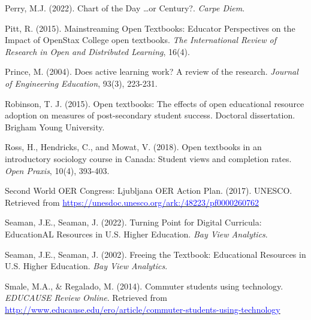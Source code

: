 \documentclass[11pt]{article}
\newcommand{\alink}[2]{\href{#1}{\textcolor{blue}{#2}}}
\begin{document}
\begin{thebibliography}{99}
   Perry, M.J. (2022). Chart of the Day \ldots or Century?. {\em Carpe Diem}.%

   Pitt, R. (2015). Mainstreaming Open Textbooks: Educator Perspectives on the Impact of OpenStax College open textbooks. {\em The International Review of Research in Open and Distributed Learning}, 16(4).

   Prince, M. (2004). Does active learning work? A review of the research. {\em Journal of Engineering Education}, 93(3), 223-231.

   Robinson, T. J. (2015). Open textbooks: The effects of open educational resource adoption on measures of post-secondary student success. Doctoral dissertation. Brigham Young University.

   Ross, H., Hendricks, C., and Mowat, V. (2018). Open textbooks in an introductory sociology course in Canada: Student views and completion rates. {\em Open Praxis}, 10(4), 393-403.

   Second World OER Congress: Ljubljana OER Action Plan. (2017). UNESCO. \newline Retrieved from \alink{https://unesdoc.unesco.org/ark:/48223/pf0000260762}{https://unesdoc.unesco.org/ark:/48223/pf0000260762}

   Seaman, J.E., Seaman, J. (2022). Turning Point for Digital Curricula: EducationAL Resources in U.S. Higher Education. {\em Bay View Analytics}.%

   Seaman, J.E., Seaman, J. (2002). Freeing the Textbook: Educational Resources in U.S. Higher Education. {\em Bay View Analytics}. %

   Smale, M.A., \& Regalado, M. (2014). Commuter students using technology. {\em EDUCAUSE Review Online}. Retrieved from \alink{http://www.educause.edu/ero/article/commuter-students-using-technology}{http://www.educause.edu/ero/article/commuter-students-using-technology}  


\end{thebibliography}
\end{document}
